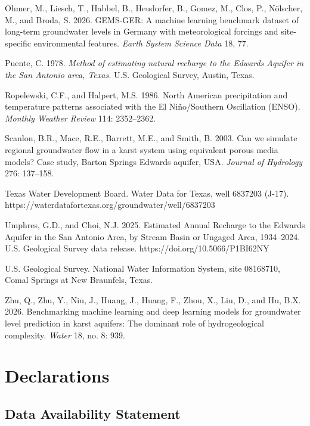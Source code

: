 \documentclass[11pt]{article}
\begin{document}
Ohmer, M., Liesch, T., Habbel, B., Heudorfer, B., Gomez, M., Clos, P.,
N\"olscher, M., and Broda, S. 2026. GEMS-GER: A machine learning benchmark
dataset of long-term groundwater levels in Germany with meteorological
forcings and site-specific environmental features. \emph{Earth System
Science Data} 18, 77.

Puente, C. 1978. \emph{Method of estimating natural recharge to the
Edwards Aquifer in the San Antonio area, Texas.} U.S. Geological Survey,
Austin, Texas.

Ropelewski, C.F., and Halpert, M.S. 1986. North American precipitation
and temperature patterns associated with the El Ni\~no/Southern
Oscillation (ENSO). \emph{Monthly Weather Review} 114: 2352--2362.

Scanlon, B.R., Mace, R.E., Barrett, M.E., and Smith, B. 2003. Can we
simulate regional groundwater flow in a karst system using equivalent
porous media models? Case study, Barton Springs Edwards aquifer, USA.
\emph{Journal of Hydrology} 276: 137--158.

Texas Water Development Board. Water Data for Texas, well 6837203
(J-17). https://waterdatafortexas.org/groundwater/well/6837203

Umphres, G.D., and Choi, N.J. 2025. Estimated Annual Recharge to the
Edwards Aquifer in the San Antonio Area, by Stream Basin or Ungaged
Area, 1934--2024. U.S. Geological Survey data release.
https://doi.org/10.5066/P1BI62NY

U.S. Geological Survey. National Water Information System, site
08168710, Comal Springs at New Braunfels, Texas.

Zhu, Q., Zhu, Y., Niu, J., Huang, J., Huang, F., Zhou, X., Liu, D., and
Hu, B.X. 2026. Benchmarking machine learning and deep learning models
for groundwater level prediction in karst aquifers: The dominant role of
hydrogeological complexity. \emph{Water} 18, no. 8: 939.

\section*{Declarations}

\subsection*{Data Availability Statement}
\end{document}
